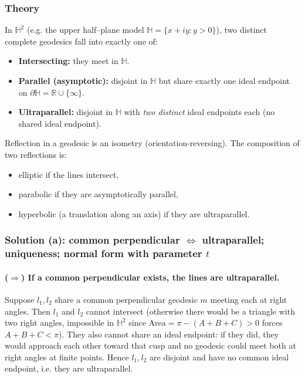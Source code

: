 \documentclass[12pt,a4paper]{article}
\newcommand{\R}{\mathbb{R}}
\newcommand{\HH}{\mathbb{H}}
\theoremstyle{plain}
\theoremstyle{definition}      %
\begin{document}
	\subsubsection*{Theory}
	In $\HH^2$ (e.g. the upper half–plane model $\HH=\{x+iy:y>0\}$), two distinct complete geodesics fall into exactly one of:
	\begin{itemize}
		\item \textbf{Intersecting:} they meet in $\HH$.
		\item \textbf{Parallel (asymptotic):} disjoint in $\HH$ but share exactly one ideal endpoint on $\partial\HH=\R\cup\{\infty\}$.
		\item \textbf{Ultraparallel:} disjoint in $\HH$ with \emph{two distinct} ideal endpoints each (no shared ideal endpoint).
	\end{itemize}
	Reflection in a geodesic is an isometry (orientation-reversing). The composition of two reflections is:
	\begin{itemize}
		\item elliptic if the lines intersect,
		\item parabolic if they are asymptotically parallel,
		\item hyperbolic (a translation along an axis) if they are ultraparallel.
	\end{itemize}
	
	\subsubsection*{Solution (a): common perpendicular $\Longleftrightarrow$ ultraparallel; uniqueness; normal form with parameter $t$}
	
	\paragraph{($\Rightarrow$) If a common perpendicular exists, the lines are ultraparallel.}
	Suppose $l_1,l_2$ share a common perpendicular geodesic $m$ meeting each at right angles. Then $l_1$ and $l_2$
	cannot intersect (otherwise there would be a triangle with two right angles, impossible in $\HH^2$ since
	$\text{Area}=\pi-(A+B+C)>0$ forces $A+B+C<\pi$). They also cannot share an ideal endpoint: if they did, they would
	approach each other toward that cusp and no geodesic could meet both at right angles at finite points.
	Hence $l_1,l_2$ are disjoint and have no common ideal endpoint, i.e. they are ultraparallel.
	
\end{document}
